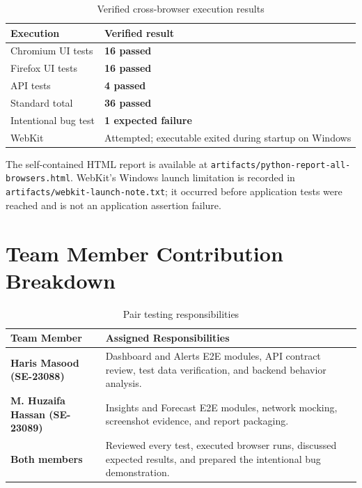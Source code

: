 \documentclass[11pt,a4paper]{article}
\begin{document}
\begin{table}[H]
\centering
\small
\begin{tabularx}{\linewidth}{@{}lX@{}}
\toprule
\textbf{Execution} & \textbf{Verified result} \\
\midrule
\rowcolor{lightgray}
Chromium UI tests & \textcolor{passgreen}{\textbf{16 passed}} \\
Firefox UI tests & \textcolor{passgreen}{\textbf{16 passed}} \\
\rowcolor{lightgray}
API tests & \textcolor{passgreen}{\textbf{4 passed}} \\
Standard total & \textcolor{passgreen}{\textbf{36 passed}} \\
\rowcolor{lightgray}
Intentional bug test & \textcolor{failred}{\textbf{1 expected failure}} \\
WebKit & Attempted; executable exited during startup on Windows \\
\bottomrule
\end{tabularx}
\caption{Verified cross-browser execution results}
\end{table}

The self-contained HTML report is available at \texttt{artifacts/python-report-all-browsers.html}. WebKit's Windows launch limitation is recorded in \texttt{artifacts/webkit-launch-note.txt}; it occurred before application tests were reached and is not an application assertion failure.

\section{Team Member Contribution Breakdown}

\begin{table}[H]
\centering
\small
\begin{tabularx}{\linewidth}{@{}p{4cm} X@{}}
\toprule
\textbf{Team Member} & \textbf{Assigned Responsibilities} \\
\midrule
\rowcolor{lightgray}
\textbf{Haris Masood (SE-23088)} & Dashboard and Alerts E2E modules, API contract review, test data verification, and backend behavior analysis. \\
\textbf{M. Huzaifa Hassan (SE-23089)} & Insights and Forecast E2E modules, network mocking, screenshot evidence, and report packaging. \\
\rowcolor{lightgray}
\textbf{Both members} & Reviewed every test, executed browser runs, discussed expected results, and prepared the intentional bug demonstration. \\
\bottomrule
\end{tabularx}
\caption{Pair testing responsibilities}
\end{table}
\end{document}
